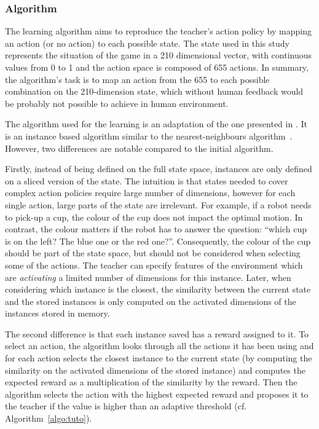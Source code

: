 \subsubsection{Algorithm}
The learning algorithm aims to reproduce the teacher's action policy by mapping an action (or no action) to each possible state. The state used in this study represents the situation of the game in a 210 dimensional vector, with continuous values from 0 to 1 and the action space is composed of 655 actions. In summary, the algorithm's task is to map an action from the 655 to each possible combination on the 210-dimension state, which without human feedback would be probably not possible to achieve in human environment.

The algorithm used for the learning is an adaptation of the one presented in \cite{senft2017toward}. It is an instance based algorithm similar to the nearest-neighbours algorithm~\citep{cover1967nearest}. However, two differences are notable compared to the initial algorithm. %

Firstly, instead of being defined on the full state space, instances are only defined on a sliced version of the state. The intuition is that states needed to cover complex action policies require large number of dimensions, however for each single action, large parts of the state are irrelevant. For example, if a robot needs to pick-up a cup, the colour of the cup does not impact the optimal motion. In contrast, the colour matters if the robot has to answer the question: ``which cup is on the left? The blue one or the red one?''. Consequently, the colour of the cup should be part of the state space, but should not be considered when selecting some of the actions. The teacher can specify features of the environment which are \textit{activating} a limited number of dimensions for this instance. Later, when considering which instance is the closest, the similarity between the current state and the stored instances is only computed on the activated dimensions of the instances stored in memory.

The second difference is that each instance saved has a reward assigned to it. To select an action, the algorithm looks through all the actions it has been using and for each action selects the closest instance to the current state (by computing the similarity on the activated dimensions of the stored instance) and computes the expected reward as a multiplication of the similarity by the reward. Then the algorithm selects the action with the highest expected reward and proposes it to the teacher if the value is higher than an adaptive threshold (cf. Algorithm~\ref{algo:tuto}). 

